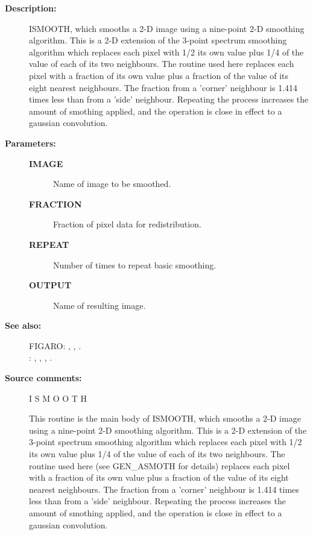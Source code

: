 \begin{description}
\begin{description}
\item [\textbf{Description:}]
 ISMOOTH, which smooths a 2-D image using a nine-point 2-D
 smoothing algorithm.  This is a 2-D extension of the 3-point
 spectrum smoothing algorithm which replaces each pixel with
 1/2 its own value plus 1/4 of the value of each of its two
 neighbours.  The routine used here replaces each pixel with
 a fraction of its own value plus a fraction of the value of
 its eight nearest neighbours.  The fraction from a 'corner'
 neighbour is 1.414 times less than from a 'side' neighbour.
 Repeating the process increases the amount of smothing applied,
 and the operation is close in effect to a gaussian convolution.

\item [\textbf{Parameters:}]
\begin{description}
\item [\textbf{IMAGE}]
 Name of image to be smoothed.
\item [\textbf{FRACTION}]
 Fraction of pixel data for redistribution.
\item [\textbf{REPEAT}]
 Number of times to repeat basic smoothing.
\item [\textbf{OUTPUT}]
 Name of resulting image.
\end{description}

\item [\textbf{See also:}]
FIGARO: , , .\\
: , , , .\\

\item [\textbf{Source comments:}]
\begin{terminalv}
 I S M O O T H

 This routine is the main body of ISMOOTH, which smooths
 a 2-D image using a nine-point 2-D smoothing algorithm.  This
 is a 2-D extension of the 3-point spectrum smoothing algorithm
 which replaces each pixel with 1/2 its own value plus 1/4 of
 the value of each of its two neighbours.  The routine used here
 (see GEN_ASMOTH for details) replaces each pixel with a fraction
 of its own value plus a fraction of the value of its eight nearest
 neighbours.  The fraction from a 'corner' neighbour is 1.414 times
 less than from a 'side' neighbour.  Repeating the process increases
 the amount of smothing applied, and the operation is close in
 effect to a gaussian convolution.


\end{terminalv}
\end{description}
\end{description}
